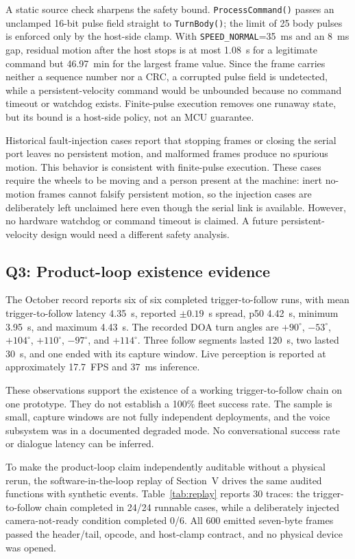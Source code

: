 \documentclass[conference]{IEEEtran}
\newcommand{\code}[1]{\texttt{#1}}
\begin{document}
A static source check sharpens the safety bound. \code{ProcessCommand()} passes an unclamped 16-bit pulse field straight to \code{TurnBody()}; the limit of 25 body pulses is enforced only by the host-side clamp. With \code{SPEED\_NORMAL}=35~ms and an 8~ms gap, residual motion after the host stops is at most 1.08~s for a legitimate command but 46.97~min for the largest frame value. Since the frame carries neither a sequence number nor a CRC, a corrupted pulse field is undetected, while a persistent-velocity command would be unbounded because no command timeout or watchdog exists. Finite-pulse execution removes one runaway state, but its bound is a host-side policy, not an MCU guarantee.

Historical fault-injection cases report that stopping frames or closing the serial port leaves no persistent motion, and malformed frames produce no spurious motion. This behavior is consistent with finite-pulse execution. These cases require the wheels to be moving and a person present at the machine: inert no-motion frames cannot falsify persistent motion, so the injection cases are deliberately left unclaimed here even though the serial link is available. However, no hardware watchdog or command timeout is claimed. A future persistent-velocity design would need a different safety analysis.

\subsection{Q3: Product-loop existence evidence}
The October record reports six of six completed trigger-to-follow runs, with mean trigger-to-follow latency 4.35~s, reported $\pm0.19$~s spread, p50 4.42~s, minimum 3.95~s, and maximum 4.43~s. The recorded DOA turn angles are $+90^\circ$, $-53^\circ$, $+104^\circ$, $+110^\circ$, $-97^\circ$, and $+114^\circ$. Three follow segments lasted 120~s, two lasted 30~s, and one ended with its capture window. Live perception is reported at approximately 17.7~FPS and 37~ms inference.

These observations support the existence of a working trigger-to-follow chain on one prototype. They do not establish a 100\% fleet success rate. The sample is small, capture windows are not fully independent deployments, and the voice subsystem was in a documented degraded mode. No conversational success rate or dialogue latency can be inferred.

To make the product-loop claim independently auditable without a physical rerun, the software-in-the-loop replay of Section~V drives the same audited functions with synthetic events. Table~\ref{tab:replay} reports 30 traces: the trigger-to-follow chain completed in 24/24 runnable cases, while a deliberately injected camera-not-ready condition completed 0/6. All 600 emitted seven-byte frames passed the header/tail, opcode, and host-clamp contract, and no physical device was opened.
\end{document}
